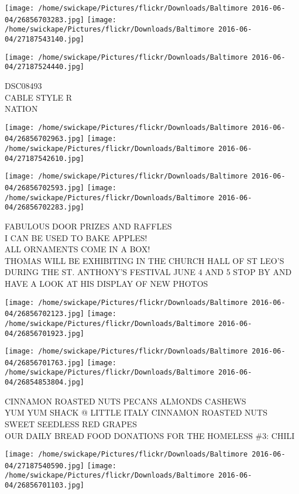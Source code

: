 \documentclass[10pt,letterpaper]{article}
\begin{document}
\texttt{[image: /home/swickape/Pictures/flickr/Downloads/Baltimore 2016-06-04/26856703283.jpg]}
\texttt{[image: /home/swickape/Pictures/flickr/Downloads/Baltimore 2016-06-04/27187543140.jpg]}

\vspace{0.25in}
\texttt{[image: /home/swickape/Pictures/flickr/Downloads/Baltimore 2016-06-04/27187524440.jpg]}

DSC08493\\
CABLE STYLE R\\
NATION
\pagebreak

\texttt{[image: /home/swickape/Pictures/flickr/Downloads/Baltimore 2016-06-04/26856702963.jpg]}
\texttt{[image: /home/swickape/Pictures/flickr/Downloads/Baltimore 2016-06-04/27187542610.jpg]}

\texttt{[image: /home/swickape/Pictures/flickr/Downloads/Baltimore 2016-06-04/26856702593.jpg]}
\texttt{[image: /home/swickape/Pictures/flickr/Downloads/Baltimore 2016-06-04/26856702283.jpg]}

FABULOUS DOOR PRIZES AND RAFFLES\\
I CAN BE USED TO BAKE APPLES!\\
ALL ORNAMENTS COME IN A BOX!\\
THOMAS WILL BE EXHIBITING IN THE CHURCH HALL OF ST LEO'S DURING THE ST. ANTHONY'S FESTIVAL JUNE 4 AND 5 STOP BY AND HAVE A LOOK AT HIS DISPLAY OF NEW PHOTOS
\pagebreak

\texttt{[image: /home/swickape/Pictures/flickr/Downloads/Baltimore 2016-06-04/26856702123.jpg]}
\texttt{[image: /home/swickape/Pictures/flickr/Downloads/Baltimore 2016-06-04/26856701923.jpg]}

\texttt{[image: /home/swickape/Pictures/flickr/Downloads/Baltimore 2016-06-04/26856701763.jpg]}
\texttt{[image: /home/swickape/Pictures/flickr/Downloads/Baltimore 2016-06-04/26854853804.jpg]}

CINNAMON ROASTED NUTS PECANS ALMONDS CASHEWS\\
YUM YUM SHACK @ LITTLE ITALY CINNAMON ROASTED NUTS\\
SWEET SEEDLESS RED GRAPES\\
OUR DAILY BREAD FOOD DONATIONS FOR THE HOMELESS \#3: CHILI
\pagebreak

\texttt{[image: /home/swickape/Pictures/flickr/Downloads/Baltimore 2016-06-04/27187540590.jpg]}
\texttt{[image: /home/swickape/Pictures/flickr/Downloads/Baltimore 2016-06-04/26856701103.jpg]}
\end{document}
